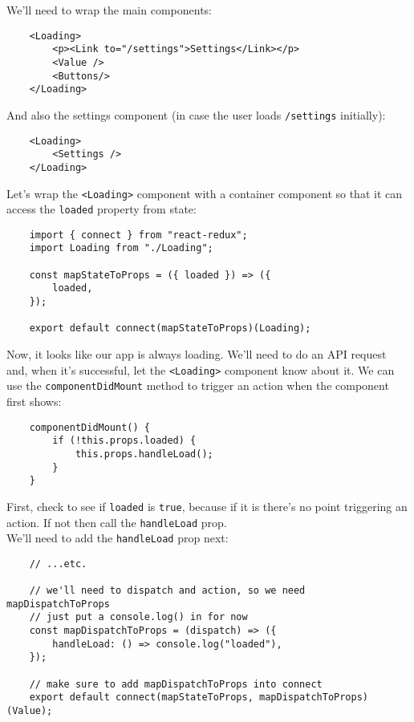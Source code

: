 We'll need to wrap the main components:

\begin{verbatim}
    <Loading>
        <p><Link to="/settings">Settings</Link></p>
        <Value />
        <Buttons/>
    </Loading>
\end{verbatim}

And also the settings component (in case the user loads \texttt{/settings} initially):

\begin{verbatim}
    <Loading>
        <Settings />
    </Loading>
\end{verbatim}

Let's wrap the \texttt{<Loading>} component with a container component so that it can access the \texttt{loaded} property from state:

\begin{verbatim}
    import { connect } from "react-redux";
    import Loading from "./Loading";

    const mapStateToProps = ({ loaded }) => ({
        loaded,
    });

    export default connect(mapStateToProps)(Loading);
\end{verbatim}

Now, it looks like our app is always loading. We'll need to do an API request and, when it's successful, let the \texttt{<Loading>} component know about it. We can use the \texttt{componentDidMount} method to trigger an action when the component first shows:

\begin{verbatim}
    componentDidMount() {
        if (!this.props.loaded) {
            this.props.handleLoad();
        }
    }
\end{verbatim}

First, check to see if \texttt{loaded} is \texttt{true}, because if it is there's no point triggering an action. If not then call the \texttt{handleLoad} prop.
\\

We'll need to add the \texttt{handleLoad} prop next:

\begin{verbatim}
    // ...etc.

    // we'll need to dispatch and action, so we need mapDispatchToProps
    // just put a console.log() in for now
    const mapDispatchToProps = (dispatch) => ({
        handleLoad: () => console.log("loaded"),
    });

    // make sure to add mapDispatchToProps into connect
    export default connect(mapStateToProps, mapDispatchToProps)(Value);
\end{verbatim}

